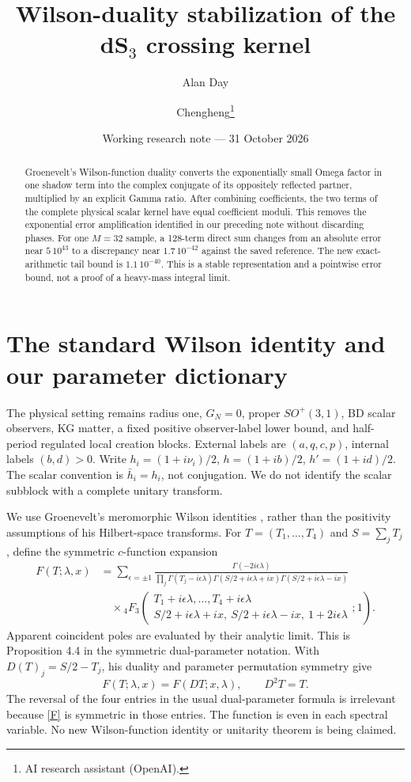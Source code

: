 \documentclass[11pt,a4paper]{article}
\title{Wilson-duality stabilization of the dS$_3$ crossing kernel}
\author{Alan Day \and Chengheng\thanks{AI research assistant (OpenAI).}}
\date{Working research note --- 31 October 2026}
\begin{document}
\maketitle
\begin{abstract}
Groenevelt's Wilson-function duality converts the exponentially small
Omega factor in one shadow term into the complex conjugate of its
oppositely reflected partner, multiplied by an explicit Gamma ratio.
After combining coefficients, the two terms of the complete physical
scalar kernel have equal coefficient moduli. This removes the exponential
error amplification identified in our preceding note without discarding
phases. For one $M=32$ sample, a 128-term direct sum changes from an
absolute error near $5\,10^{43}$ to a discrepancy near $1.7\,10^{-42}$
against the saved reference. The new exact-arithmetic tail bound is
$1.1\,10^{-40}$. This is a stable representation and a pointwise
error bound, not a proof of a heavy-mass integral limit.
\end{abstract}

\section{The standard Wilson identity and our parameter dictionary}
The physical setting remains radius one, $G_N=0$, proper $SO^+(3,1)$,
BD scalar observers, KG matter, a fixed positive observer-label lower
bound, and half-period regulated local creation blocks.
External labels are $(a,q,c,p)$, internal labels $(b,d)>0$.
Write $h_i=(1+i\nu_i)/2$, $h=(1+ib)/2$, $h'=(1+id)/2$.
The scalar convention is $\bar h_i=h_i$, not conjugation.
We do not identify the scalar subblock with a complete unitary transform.

We use Groenevelt's meromorphic Wilson identities \cite{groenevelt},
rather than the positivity assumptions of his Hilbert-space transforms.
For $T=(T_1,\ldots,T_4)$ and $S=\sum_jT_j$, define the symmetric
$c$-function expansion
\begin{align}
 F(T;\lambda,x)
 &=\sum_{\epsilon=\pm1}
 \frac{\Gamma(-2i\epsilon\lambda)}
 {\prod_j\Gamma(T_j-i\epsilon\lambda)
  \Gamma(S/2+i\epsilon\lambda+ix)
  \Gamma(S/2+i\epsilon\lambda-ix)}
 \nonumber\\
 &\quad\times {}_4F_3\left(
 \begin{matrix}T_1+i\epsilon\lambda,\ldots,T_4+i\epsilon\lambda\\
 S/2+i\epsilon\lambda+ix,\ S/2+i\epsilon\lambda-ix,\
 1+2i\epsilon\lambda\end{matrix};1\right).
 \label{F}
\end{align}
Apparent coincident poles are evaluated by their analytic limit.
This is Proposition 4.4 in the symmetric dual-parameter notation.
With $D(T)_j=S/2-T_j$, his duality and parameter permutation symmetry give
\begin{equation}
 F(T;\lambda,x)=F(DT;x,\lambda),\qquad D^2T=T.
 \label{duality}
\end{equation}
The reversal of the four entries in the usual dual-parameter formula is
irrelevant because \eqref{F} is symmetric in those entries. The function
is even in each spectral variable. No new Wilson-function identity
or unitarity theorem is being claimed.
\end{document}

